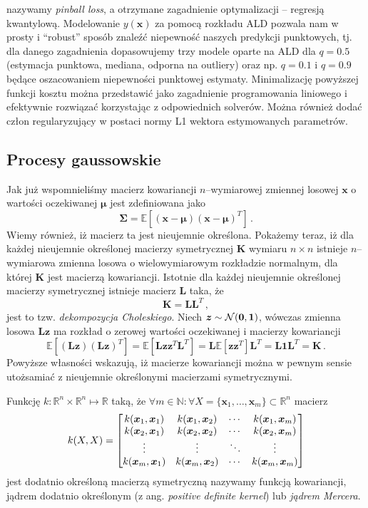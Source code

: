\documentclass{myclass}
\numberwithin{equation}{subsection}
\begin{document}
nazywamy \emph{pinball loss}, a otrzymane zagadnienie optymalizacji -- regresją kwantylową.
Modelowanie \(y(\bm{x})\) za pomocą rozkładu ALD pozwala nam w prosty i \enquote{robust} sposób
znaleźć niepewność naszych predykcji punktowych, tj. dla danego zagadnienia dopasowujemy trzy modele
oparte na ALD dla \(q = 0.5\) (estymacja punktowa, mediana, odporna na outliery) oraz np. \(q =
0.1\) i \(q = 0.9\) będące oszacowaniem niepewności punktowej estymaty. Minimalizację powyższej
funkcji kosztu można przedstawić jako zagadnienie programowania liniowego i efektywnie rozwiązać
korzystając z odpowiednich solverów. Można również dodać człon regularyzujący w postaci normy L1
wektora estymowanych parametrów.


\subsection{Procesy gaussowskie}

Jak już wspomnieliśmy macierz kowariancji \(n\)--wymiarowej zmiennej losowej \(\bm{x}\) o wartości
oczekiwanej \(\bm{\mu}\) jest zdefiniowana jako
\[
\bm{\Sigma} = \mathbb{E}\left[(\bm{x} - \bm{\mu})(\bm{x} - \bm{\mu})^T\right]\,.
\]
Wiemy również, iż macierz ta jest nieujemnie określona. Pokażemy teraz, iż dla każdej nieujemnie
określonej macierzy symetrycznej \(\bm{K}\) wymiaru \(n\times n\) istnieje \(n\)--wymiarowa zmienna
losowa o wielowymiarowym rozkładzie normalnym, dla której \(\bm{K}\) jest macierzą kowariancji.
Istotnie dla każdej nieujemnie określonej macierzy symetrycznej istnieje macierz \(\bm{L}\) taka, że
\[
\bm{K} = \bm{L}\bm{L}^T\,,
\]
jest to tzw. \emph{dekompozycja Choleskiego}. Niech \(\bm{z} \sim \mathcal{N}(\bm{0}, \bm{1})\), wówczas
zmienna losowa \(\bm{L}\bm{z}\) ma rozkład o zerowej wartości oczekiwanej i macierzy kowariancji
\[
\mathbb{E}\left[(\bm{L}\bm{z})(\bm{L}\bm{z})^T\right] = \mathbb{E}\left[\bm{L}\bm{z}\bm{z}^T\bm{L}^T\right] = \bm{L}\mathbb{E}[\bm{z}\bm{z}^T]\bm{L}^T = \bm{L}\bm{1}\bm{L}^T = \bm{K}\,.
\]
Powyższe własności wskazują, iż macierze kowariancji można w pewnym sensie utożsamiać z nieujemnie
określonymi macierzami symetrycznymi.

\begin{definition}
Funkcję \(k: \mathbb{R}^n\times\mathbb{R}^n\mapsto\mathbb{R}\) taką, że \(\forall m\in\mathbb{N} :
\forall X = \{\bm{x}_1,\ldots,\bm{x}_m\} \subset \mathbb{R}^n\) macierz
\[
k(X,X) = \mqty[k(\bm{x}_1, \bm{x}_1) & k(\bm{x}_1, \bm{x}_2) & \cdots & k(\bm{x}_1, \bm{x}_m)\\
k(\bm{x}_2, \bm{x}_1) & k(\bm{x}_2, \bm{x}_2) & \cdots & k(\bm{x}_2, \bm{x}_m)\\
\vdots & \vdots & \ddots & \vdots\\
k(\bm{x}_m, \bm{x}_1) & k(\bm{x}_m, \bm{x}_2) & \cdots & k(\bm{x}_m, \bm{x}_m)\\]
\]
jest dodatnio określoną macierzą symetryczną nazywamy funkcją kowariancji, jądrem dodatnio
określonym (z ang. \textit{positive definite kernel}) lub \emph{jądrem Mercera}.
\end{definition}
\end{document}
